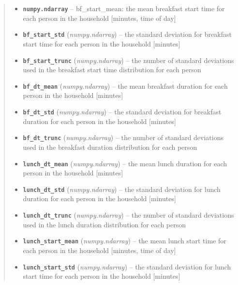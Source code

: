 \documentclass[letterpaper,10pt,english]{sphinxmanual}
\begin{document}
\begin{fulllineitems}
\begin{quote}
\begin{description}
\begin{itemize}
\item {} 
\textbf{\texttt{numpy.ndarray}} -- bf\_start\_mean: the mean breakfast start time for each person in the household     {[}minutes, time of day{]}

\item {} 
\textbf{\texttt{bf\_start\_std}} (\emph{numpy.ndarray}) -- the standard deviation for breakfast start time for each person in the     household {[}minutes{]}

\item {} 
\textbf{\texttt{bf\_start\_trunc}} (\emph{numpy.ndarray}) -- the number of standard deviations used in the breakfast start time     distribution for each person

\item {} 
\textbf{\texttt{bf\_dt\_mean}} (\emph{numpy.ndarray}) -- the mean breakfast duration for each person in the household {[}minutes{]}

\item {} 
\textbf{\texttt{bf\_dt\_std}} (\emph{numpy.ndarray}) -- the standard deviation for breakfast duration for each person in the     household {[}minutes{]}

\item {} 
\textbf{\texttt{bf\_dt\_trunc}} (\emph{numpy.ndarray}) -- the number of standard deviations used in the breakfast duration     distribution for each person

\item {} 
\textbf{\texttt{lunch\_dt\_mean}} (\emph{numpy.ndarray}) -- the mean lunch duration for each person in the household {[}minutes{]}

\item {} 
\textbf{\texttt{lunch\_dt\_std}} (\emph{numpy.ndarray}) -- the standard deviation for lunch duration for each person in the     household {[}minutes{]}

\item {} 
\textbf{\texttt{lunch\_dt\_trunc}} (\emph{numpy.ndarray}) -- the number of standard deviations used in the lunch duration     distribution for each person

\item {} 
\textbf{\texttt{lunch\_start\_mean}} (\emph{numpy.ndarray}) -- the mean lunch start time for each person in the household     {[}minutes, time of day{]}

\item {} 
\textbf{\texttt{lunch\_start\_std}} (\emph{numpy.ndarray}) -- the standard deviation for lunch start time for each person in the     household {[}minutes{]}


\end{itemize}
\end{description}
\end{quote}
\end{fulllineitems}
\end{document}
